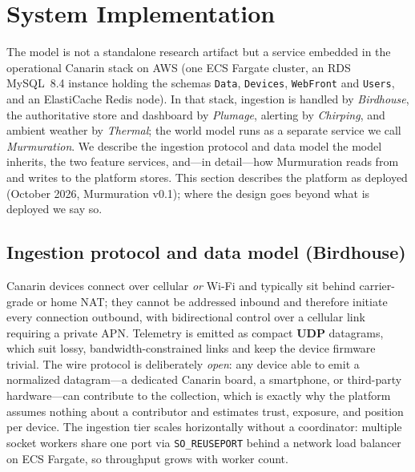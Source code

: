 \documentclass[10pt]{article}
\begin{document}
\section{System Implementation}
\label{sec:impl}
The model is not a standalone research artifact but a service embedded in the
operational Canarin stack on AWS (one ECS Fargate cluster, an RDS MySQL~8.4
instance holding the schemas \texttt{Data}, \texttt{Devices}, \texttt{WebFront}
and \texttt{Users}, and an ElastiCache Redis node). In that stack, ingestion is
handled by \emph{Birdhouse}, the authoritative store and dashboard by
\emph{Plumage}, alerting by \emph{Chirping}, and ambient weather by
\emph{Thermal}; the world model runs as a separate service we call
\emph{Murmuration}. We describe the ingestion protocol and data model the model
inherits, the two feature services, and---in detail---how Murmuration reads from
and writes to the platform stores. This section describes the platform as
deployed (October 2026, Murmuration v0.1); where the design goes beyond what is
deployed we say so.

\subsection{Ingestion protocol and data model (Birdhouse)}
\label{sec:birdhouse}
Canarin devices connect over cellular \emph{or} Wi-Fi and typically sit behind
carrier-grade or home NAT; they cannot be addressed inbound and therefore initiate
every connection outbound, with bidirectional control over a cellular link
requiring a private APN. Telemetry is emitted as compact \textbf{UDP} datagrams,
which suit lossy, bandwidth-constrained links and keep the device firmware trivial.
The wire protocol is deliberately \emph{open}: any device able to emit a normalized
datagram---a dedicated Canarin board, a smartphone, or third-party hardware---can
contribute to the collection, which is exactly why the platform assumes nothing
about a contributor and estimates trust, exposure, and position per device. The
ingestion tier scales horizontally without a coordinator: multiple socket workers
share one port via \texttt{SO\_REUSEPORT} behind a network load balancer on ECS
Fargate, so throughput grows with worker count.
\end{document}
